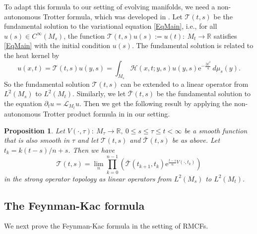 \documentclass[12pt]{amsart}
\numberwithin{equation}{section}
\newtheorem{proposition}[theorem]{Proposition}
\numberwithin{equation}{section}
\newcommand{\cL}{\mathcal{L}}
\newcommand{\R}{\mathbb{R}}
\begin{document}
	To adapt this formula to our setting of evolving manifolds, we need a non-autonomous Trotter formula, which was developed in  \cite{V, VWZ}. 
	Let $\mathcal T(t,s)$ be the fundamental solution to the variational equation \eqref{EqMain}, i.e., for all $u(s)\in C^\infty(M_s)$, the function $\mathcal T(t,s)u(s):=u(t):\ M_t\to \R$ satisfies \eqref{EqMain} with the initial condition $u(s)$. The fundamental solution is related to the heat kernel by $$u(x,t)=\mathcal T(t,s)u(y,s)=\int_{M_s}\mathcal H(x,t;y,s)u(y,s)\mathrm{e}^{-\frac{|y|^2}{4}}\,d\mu_s(y).$$ 
	So the fundamental solution $\mathcal T(t,s)$ can be extended to a linear operator from $L^2(M_s)$ to $L^2(M_t)$. 
	Similarly, we let $\bar{\mathcal T}(t,s)$ be the fundamental solution to the equation $\partial_t u=\cL_{M_t} u$. Then we get the following result by applying the non-autonomous Trotter product formula in \cite{V} in our setting. 
	
	\begin{proposition}Let $V(\cdot, \tau):\ M_\tau\to \R,\ 0\leq s\leq \tau\leq t<\infty$ be a smooth function that is also smooth in $\tau$ and let $\mathcal T(t,s)$ and $\bar{\mathcal T}(t,s)$ be as above. Let $t_k=k(t-s)/n+s$. Then we have 
		$$\mathcal T(t,s)=\lim_n\prod_{k=0}^{n-1}\left(\bar{\mathcal T}(t_{k+1}, t_k) \mathrm{e}^{\frac{t-s}{n}V(\cdot ,t_k)}\right)$$
		in the strong operator topology as linear operators from $L^2(M_s)$ to $L^2(M_t)$. 
	\end{proposition}
	
	\subsection{The Feynman-Kac formula}
	We next prove the Feynman-Kac formula in the setting of RMCFs.
	
\end{document}
